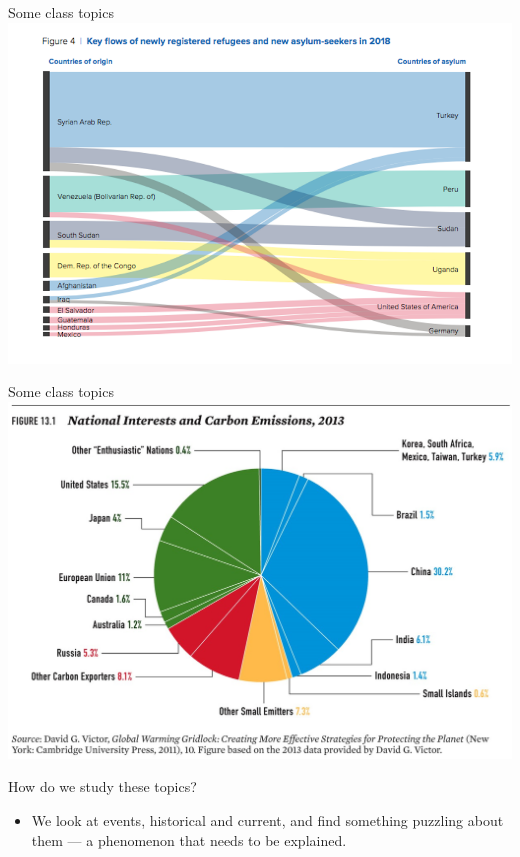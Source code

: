\documentclass[handout]{beamer}
\begin{document}
\begin{frame}{\LARGE Some class topics} %
	\includegraphics[width=\textwidth]{refugee flows.png}
\end{frame}

\begin{frame}{\LARGE Some class topics}
\centering
\includegraphics[width=\textwidth,height=0.8\textheight,keepaspectratio]{environment and national interests.jpg}
\end{frame}

\begin{frame}{\LARGE How do we study these topics?}
\begin{itemize}
    \item We look at events, historical and current, and find something puzzling about them --- a phenomenon that needs to be explained.
\end{itemize}
\end{frame}
\end{document}
